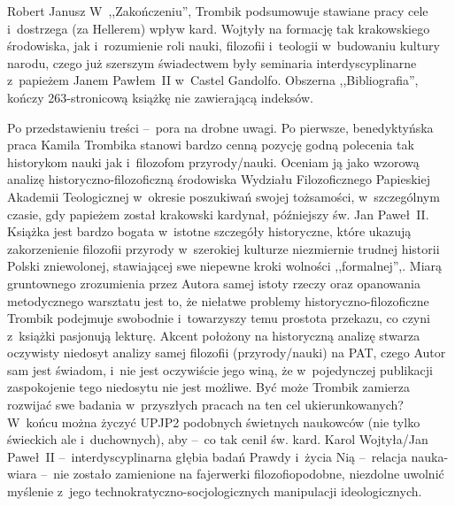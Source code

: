 \begin{newrevplenv}{Robert Janusz}
W~,,Zakończeniu'', Trombik podsumowuje stawiane pracy cele i~dostrzega (za Hellerem) wpływ kard. Wojtyły na formację tak krakowskiego środowiska, jak i~rozumienie roli nauki, filozofii i~teologii w~budowaniu kultury narodu, czego już szerszym świadectwem były seminaria interdyscyplinarne z~papieżem Janem Pawłem~II w~Castel Gandolfo. Obszerna ,,Bibliografia'', kończy 263-stronicową książkę nie zawierającą indeksów.

Po przedstawieniu treści --~pora na drobne uwagi. Po pierwsze, benedyktyńska praca Kamila Trombika stanowi bardzo cenną pozycję godną polecenia tak historykom nauki jak i~filozofom przyrody/nauki. Oceniam ją jako wzorową analizę historyczno-filozoficzną środowiska Wydziału Filozoficznego Papieskiej Akademii Teologicznej w~okresie poszukiwań swojej tożsamości, w~szczególnym czasie, gdy papieżem został krakowski kardynał, późniejszy św. Jan Paweł~II. Książka jest bardzo bogata w~istotne szczegóły historyczne, które ukazują zakorzenienie filozofii przyrody w~szerokiej kulturze niezmiernie trudnej historii Polski zniewolonej, stawiającej swe niepewne kroki wolności ,,formalnej'',. Miarą gruntownego zrozumienia przez Autora samej istoty rzeczy oraz opanowania metodycznego warsztatu jest to, że niełatwe problemy historyczno-filozoficzne Trombik podejmuje swobodnie i~towarzyszy temu prostota przekazu, co czyni z~książki pasjonują lekturę. Akcent położony na historyczną analizę stwarza oczywisty niedosyt analizy samej filozofii (przyrody/nauki) na PAT, czego Autor sam jest świadom, i~nie jest oczywiście jego winą, że w~pojedynczej publikacji zaspokojenie tego niedosytu nie jest możliwe. Być może Trombik zamierza rozwijać swe badania w~przyszłych pracach na ten cel ukierunkowanych? W~końcu można życzyć UPJP2 podobnych świetnych naukowców (nie tylko świeckich ale i~duchownych), aby --~co tak cenił św. kard. Karol Wojtyła/Jan Paweł~II --~interdyscyplinarna głębia badań Prawdy i~życia Nią --~relacja nauka-wiara --~nie zostało zamienione na fajerwerki filozofiopodobne, niezdolne uwolnić myślenie z~jego technokratyczno-socjologicznych manipulacji ideologicznych.





\vspace{5mm}%
\begin{flushright}
{\chaptitleeng\color{black!50}{An important step towards understanding the identity of the philosophy of the Interdisciplinary Research Center --~Lorem ipsumn}}
\end{flushright}


\end{newrevplenv}
